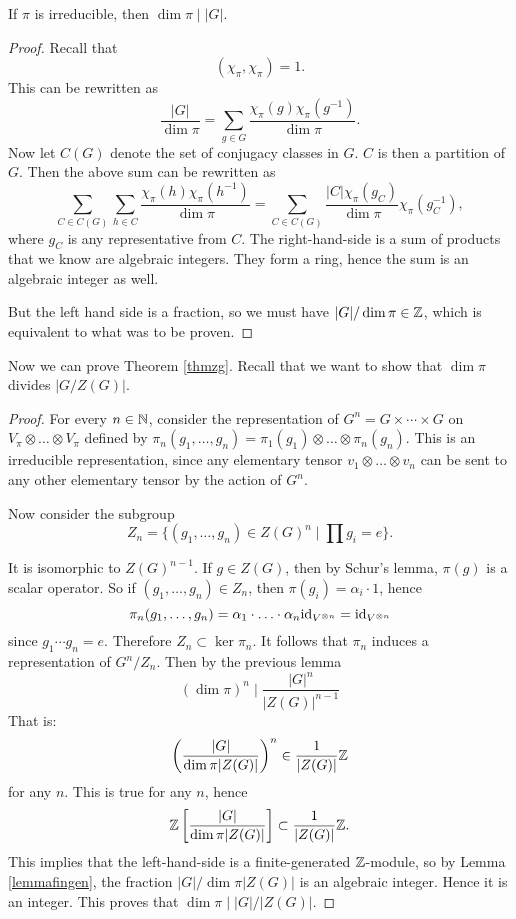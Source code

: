 \documentclass[11pt, english]{article}
\begin{document}
\begin{lemma}
 If $\pi$ is irreducible, then $\dim \pi \mid \lvert G \rvert$.
\end{lemma}
\begin{proof}
Recall that
$$
(\chi_\pi , \chi_\pi) = 1.
$$
This can be rewritten as
$$
\frac{\lvert G \rvert}{\dim \pi} = \sum_{g \in G} \frac{\chi_\pi(g) \chi_\pi(g^{-1})}{\dim \pi}.
$$
Now let $C(G)$ denote the set of conjugacy classes in $G$. $C$ is then a partition of $G$. Then the above sum can be rewritten as
$$
\sum_{C \in C(G)} \sum_{h \in C} \frac{\chi_\pi(h) \chi_\pi(h^{-1})}{\dim \pi} = \sum_{C \in C(G)}  \frac{\lvert C \rvert \chi_\pi(g_C) }{\dim \pi}  \chi_\pi(g_C^{-1}),
$$
where $g_C$ is any representative from $C$. The right-hand-side is a sum of products that we know are algebraic integers. They form a ring, hence the sum is an algebraic integer as well.

But the left hand side is a fraction, so we must have $\lvert G \rvert / \dim \pi \in \mathbb{Z}$, which is equivalent to what was to be proven.
\end{proof}

Now we can prove Theorem \ref{thmzg}. Recall that we want to show that $\dim \pi$ divides $\lvert G/Z(G) \rvert$. 

\begin{proof}
 For every $n \in \mathbb{N}$, consider the representation of $G^n = G \times \cdots \times G$ on $V_\pi \otimes \ldots \otimes V_\pi$ defined by $\pi_n(g_1,\ldots,g_n) = \pi_1(g_1) \otimes \ldots \otimes \pi_n(g_n)$. This is an irreducible representation, since any elementary tensor $v_1 \otimes \ldots \otimes v_n$ can be sent to any other elementary tensor by the action of $G^n$.

Now consider the subgroup $$Z_n = \{ (g_1,\ldots,g_n) \in Z(G)^n \mid \prod g_i = e \}.$$

It is isomorphic to $Z(G)^{n-1}$. If $g \in Z(G)$, then by Schur's lemma, $\pi(g)$ is a scalar operator. So if $(g_1,\ldots,g_n) \in Z_n$, then $\pi(g_i)=\alpha_i \cdot 1$, hence
\[
\pi_n(g_1,\ldots,g_n) = \alpha_1 \cdot \ldots \cdot \alpha_n \text{id}_{V^{\otimes n}} = \text{id}_{V^{\otimes n}}
\]
since $g_1\cdots g_n = e$. Therefore $Z_n \subset \ker \pi_n$. It follows that $\pi_n$ induces a representation of $G^n/Z_n$. Then by the previous lemma
$$
(\dim \pi)^n \mid \frac{\lvert G \rvert^n }{\lvert Z(G) \rvert ^{n-1}}
$$
That is:
$$
\left( \frac{\lvert G \rvert}{\dim \pi \lvert Z(G) \rvert } \right)^n \in \frac{1}{\lvert Z(G) \rvert}\mathbb{Z}
$$
for any $n$. This is true for any $n$, hence
$$
\mathbb{Z} \left[ \frac{\lvert G \rvert}{\dim \pi \lvert Z(G) \rvert} \right] \subset \frac{1}{\lvert Z(G) \rvert } \mathbb{Z}.
$$
This implies that the left-hand-side is a finite-generated $\mathbb{Z}$-module, so by Lemma \ref{lemmafingen}, the fraction $\lvert G \rvert /\dim \pi |Z(G)|$ is an algebraic integer. Hence it is an integer. This proves that $\dim \pi \mid \lvert G \rvert / \lvert Z(G) \rvert$.
\end{proof}
\end{document}

